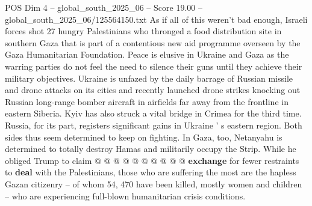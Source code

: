 \begin{textsample}{POS Dim 4 – global\_south\_2025\_06 – Score 19.00 – global\_south\_2025\_06/125564150.txt}
As if all of this weren't bad enough, Israeli forces shot 27 hungry Palestinians who thronged a food distribution site in southern Gaza that is part of a contentious new aid programme overseen by the Gaza Humanitarian Foundation.
Peace is elusive in Ukraine and Gaza as the warring parties do not feel the need to silence their guns until they achieve their military objectives.
Ukraine is unfazed by the daily barrage of Russian missile and drone attacks on its cities and recently launched drone strikes knocking out Russian long-range bomber aircraft in airfields far away from the frontline in eastern Siberia.
Kyiv has also struck a vital bridge in Crimea for the third time.
Russia, for its part, registers significant gains in Ukraine ' s eastern region.
Both sides thus seem determined to keep on fighting.
In Gaza, too, Netanyahu is determined to totally destroy Hamas and militarily occupy the Strip.
While he obliged Trump to claim @ @ @ @ @ @ @ @ @ @ \textbf{exchange} for fewer restraints to \textbf{deal} with the Palestinians, those who are suffering the most are the hapless Gazan citizenry -- of whom 54, 470 have been killed, mostly women and children -- who are experiencing full-blown humanitarian crisis conditions.

\end{textsample}

